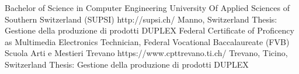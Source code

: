 \begin{CV}
    {Bachelor of Science in Computer Engineering}
    {University Of Applied Sciences of Southern Switzerland (SUPSI)}
    {http://supsi.ch/}
    {Manno, Switzerland}
    {Thesis: Gestione della produzione di prodotti DUPLEX}
    {Federal Certificate of Proficency as Multimedia Electronics Technician, Federal Vocational Baccalaureate (FVB)}
    {Scuola Arti e Mestieri Trevano}
    {https://www.cpttrevano.ti.ch/}
    {Trevano, Ticino, Switzerland}
    {Thesis: Gestione della produzione di prodotti DUPLEX}
\end{CV}